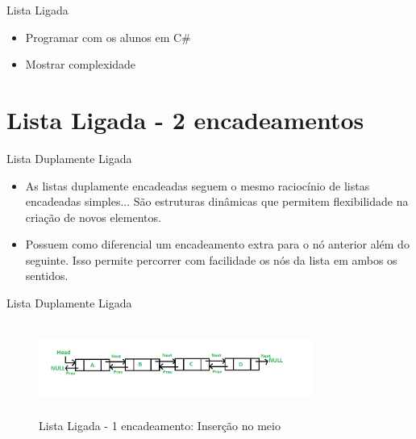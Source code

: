 \begin{frame}
	\begin{block}{Lista Ligada}
	\begin{itemize}
			\item Programar com os alunos em C\#
			\item Mostrar complexidade
		\end{itemize}
	\end{block}
\end{frame}

\section{Lista Ligada - 2 encadeamentos}
\begin{frame}
	\begin{block}{Lista Duplamente Ligada}
	\begin{itemize}
			\item As listas duplamente encadeadas seguem o mesmo raciocínio de listas encadeadas simples... São estruturas dinâmicas que permitem flexibilidade na criação de novos elementos.

			\item Possuem como  diferencial um encadeamento extra para o nó anterior além do seguinte. Isso permite percorrer com facilidade os nós da lista em ambos os sentidos.
		\end{itemize}
	\end{block}
\end{frame}

\begin{frame}
	\begin{block}{Lista Duplamente Ligada}
		\begin{figure}[!htb]
			\centering	  				
			\includegraphics[height=3cm, width = 9cm]{./pic/DLL1.png}
			\caption{Lista Ligada - 1 encadeamento: Inserção no meio \cite{GEEKS_2018}}
			\label{fig_LLS_six}
		\end{figure}
	\end{block}
\end{frame}

